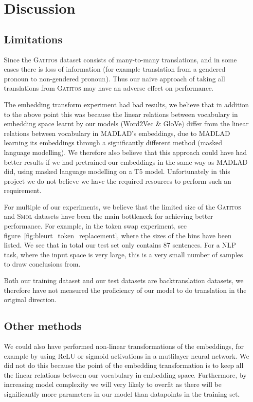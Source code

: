 \section{Discussion}

\subsection{Limitations}
Since the \textsc{Gatitos} dataset consists of many-to-many translations, and in some cases there is loss of information (for example translation from a gendered pronoun to non-gendered pronoun). Thus our naive approach of taking all translations from \textsc{Gatitos} may have an adverse effect on performance.

The embedding transform experiment had bad results, we believe that in addition to the above point this was because the linear relations between vocabulary in embedding space learnt by our models (Word2Vec \& GloVe) differ from the linear relations between vocabulary in MADLAD's embeddings, due to MADLAD learning its embeddings through a significantly different method (masked language modelling). We therefore also believe that this approach could have had better results if we had pretrained our embeddings in the same way as MADLAD did, using masked language modelling on a T5 model. Unfortunately in this project we do not believe we have the required resources to perform such an requirement.

For multiple of our experiments, we believe that the limited size of the \textsc{Gatitos} and \textsc{Smol} datasets have been the main bottleneck for achieving better performance. For example, in the token swap experiment, see figure~\ref{fig:bleurt_token_replacement}, where the sizes of the bins have been listed. We see that in total our test set only contains 87 sentences. For a NLP task, where the input space is very large, this is a very small number of samples to draw conclusions from.

Both our training dataset and our test datasets are backtranslation datasets, we therefore have not measured the proficiency of our model to do translation in the original direction.
\subsection{Other methods}
We could also have performed non-linear transformations of the embeddings, for example by using ReLU or sigmoid activations in a mutlilayer neural network. We did not do this because the point of the embedding transformation is to keep all the linear relations between our vocabulary in embedding space. Furthermore, by increasing model complexity we will very likely to overfit as there will be significantly more parameters in our model than datapoints in the training set.

